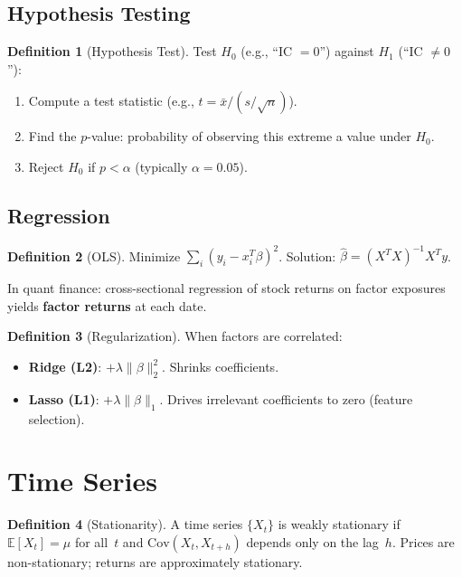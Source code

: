 \documentclass[a4paper, 11pt]{report}
\theoremstyle{definition}
\newtheorem{definition}{Definition}[chapter]
\theoremstyle{remark}
\begin{document}
\subsection{Hypothesis Testing}

\begin{definition}[Hypothesis Test]
    Test $H_0$ (e.g., ``IC $= 0$'') against $H_1$ (``IC $\neq 0$''):
    \begin{enumerate}
        \item Compute a test statistic (e.g., $t = \bar{x} / (s/\sqrt{n})$).
        \item Find the $p$-value: probability of observing this extreme a value
              under $H_0$.
        \item Reject $H_0$ if $p < \alpha$ (typically $\alpha = 0.05$).
    \end{enumerate}
\end{definition}

\subsection{Regression}

\begin{definition}[OLS]
    Minimize $\sum_i (y_i - x_i^T\beta)^2$.  Solution:
    $\hat{\beta} = (X^TX)^{-1}X^Ty$.

    In quant finance: cross-sectional regression of stock returns on factor
    exposures yields \textbf{factor returns} at each date.
\end{definition}

\begin{definition}[Regularization]
    When factors are correlated:
    \begin{itemize}
        \item \textbf{Ridge (L2)}: $+ \lambda\|\beta\|_2^2$.  Shrinks
              coefficients.
        \item \textbf{Lasso (L1)}: $+ \lambda\|\beta\|_1$.  Drives
              irrelevant coefficients to zero (feature selection).
    \end{itemize}
\end{definition}


\section{Time Series}
\label{sec:math-ts}

\begin{definition}[Stationarity]
    A time series $\{X_t\}$ is weakly stationary if
    $\mathbb{E}[X_t] = \mu$ for all~$t$ and
    $\text{Cov}(X_t, X_{t+h})$ depends only on the lag~$h$.
    Prices are non-stationary; returns are approximately stationary.
\end{definition}
\end{document}
